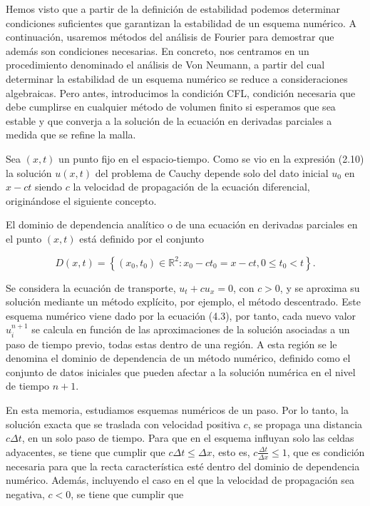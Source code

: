 Hemos visto que a partir de la definición de estabilidad podemos
determinar condiciones suficientes que garantizan la estabilidad de un esquema numérico.
A continuación, usaremos métodos del análisis de Fourier para
demostrar que además son condiciones necesarias.
En concreto, nos centramos en un procedimiento denominado el análisis
de Von Neumann, a partir del cual determinar la estabilidad de un
esquema numérico se reduce a consideraciones algebraicas.
Pero antes, introducimos la condición CFL, condición necesaria que
debe cumplirse en cualquier método de volumen finito si esperamos que
sea estable y que converja a la solución de la ecuación en derivadas
parciales a medida que se refine la malla.

Sea $\left(x,t\right)$ un punto fijo en el espacio-tiempo.
Como se vio en la expresión (2.10) la solución $u\left(x,t\right)$
del problema de Cauchy depende solo del dato inicial $u_{0}$ en $x-ct$ siendo $c$
la velocidad de propagación de la ecuación diferencial,
originándose el siguiente concepto.

\begin{definition}
  El dominio de dependencia analítico o de una ecuación en derivadas parciales
  en el punto $\left(x,t\right)$ está definido por el conjunto

  \begin{equation*}
    D\left(x,t\right)=
    \left\{
    \left(x_{0},t_{0}\right)\in\mathbb{R}^{2}:
    x_{0}-ct_{0}=x-ct,
    0\leq t_{0}<t
    \right\}.
  \end{equation*}
\end{definition}

Se considera la ecuación de transporte, $u_t+cu_x=0$, con $c>0$, y se aproxima su
solución mediante un método explícito, por ejemplo, el método descentrado.
Este esquema numérico viene dado por la ecuación (4.3), por tanto, cada nuevo valor
$u^{n+1}_{i}$ se calcula en función de las aproximaciones de la solución asociadas
a un paso de tiempo previo, todas estas dentro de una región.
A esta región se le denomina el dominio de dependencia de un método numérico,
definido como el conjunto de datos iniciales que pueden afectar a la solución
numérica en el nivel de tiempo $n+1$.

En esta memoria, estudiamos esquemas numéricos de un paso.
Por lo tanto, la solución exacta que se traslada con velocidad
positiva $c$, se propaga una distancia $c\Delta t$, en un solo paso de tiempo.
Para que en el esquema inﬂuyan solo las celdas adyacentes, se tiene
que cumplir que $c\Delta t\leq\Delta x$, esto es,
$c\frac{\Delta t}{\Delta x}\leq 1$, que es condición necesaria para
que la recta característica esté dentro del dominio de dependencia numérico.
Además, incluyendo el caso en el que la velocidad de propagación sea
negativa, $c<0$, se tiene que cumplir que

